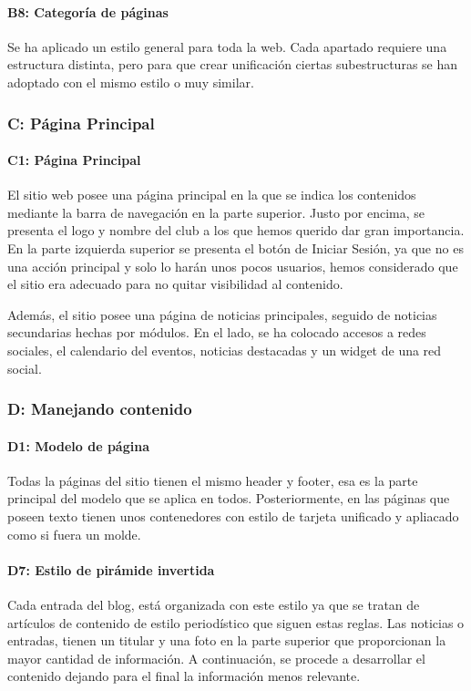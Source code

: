 \documentclass[10pt, spanish, pdftex]{template/UC3M_document}
\begin{document}
\paragraph{B8: Categoría de páginas}
  Se ha aplicado un estilo general para toda la web. Cada apartado requiere una estructura distinta, pero para que crear unificación ciertas subestructuras se han adoptado con el mismo estilo o muy similar.
\subsubsection{C: Página Principal}
\paragraph{C1: Página Principal}
  El sitio web posee una página principal en la que se indica los contenidos mediante la barra de navegación en la parte superior. Justo por encima, se presenta el logo y nombre del club a los que hemos querido dar gran importancia. En la parte izquierda superior se presenta el botón de Iniciar Sesión, ya que no es una acción principal y solo lo harán unos pocos usuarios, hemos considerado que el sitio era adecuado para no quitar visibilidad al contenido.

  Además, el sitio posee una página de noticias principales, seguido de noticias secundarias hechas por módulos. En el lado, se ha colocado accesos a redes sociales, el calendario del eventos, noticias destacadas y un widget de una red social.


\subsubsection{D: Manejando contenido}
\paragraph{D1: Modelo de página}
  Todas la páginas del sitio tienen el mismo header y footer, esa es la parte principal del modelo que se aplica en todos. Posteriormente, en las páginas que poseen texto tienen unos contenedores con estilo de tarjeta unificado y apliacado como si fuera un molde.
\paragraph{D7: Estilo de pirámide invertida}
  Cada entrada del blog, está organizada con este estilo ya que se tratan de artículos de contenido de estilo periodístico que siguen estas reglas. Las noticias o entradas, tienen un titular y una foto en la parte superior que proporcionan la mayor cantidad de información. A continuación, se procede a desarrollar el contenido dejando para el final la información menos relevante.
\end{document}
